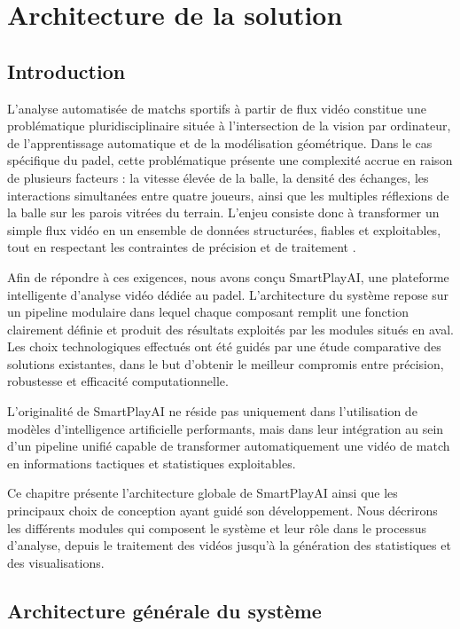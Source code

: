 \chapter{Architecture de la solution}

\section{Introduction}

L’analyse automatisée de matchs sportifs à partir de flux vidéo constitue une problématique pluridisciplinaire située à l’intersection de la vision par ordinateur, de l’apprentissage automatique et de la modélisation géométrique. Dans le cas spécifique du padel, cette problématique présente une complexité accrue en raison de plusieurs facteurs : la vitesse élevée de la balle, la densité des échanges, les interactions simultanées entre quatre joueurs, ainsi que les multiples réflexions de la balle sur les parois vitrées du terrain. L’enjeu consiste donc à transformer un simple flux vidéo en un ensemble de données structurées, fiables et exploitables, tout en respectant les contraintes de précision et de traitement  .

Afin de répondre à ces exigences, nous avons conçu SmartPlayAI, une plateforme intelligente d’analyse vidéo dédiée au padel. L’architecture du système repose sur un pipeline modulaire dans lequel chaque composant remplit une fonction clairement définie et produit des résultats exploités par les modules situés en aval. Les choix technologiques effectués ont été guidés par une étude comparative des solutions existantes, dans le but d’obtenir le meilleur compromis entre précision, robustesse et efficacité computationnelle.

L’originalité de SmartPlayAI ne réside pas uniquement dans l’utilisation de modèles d’intelligence artificielle performants, mais dans leur intégration au sein d’un pipeline unifié capable de transformer automatiquement une vidéo de match en informations tactiques et statistiques exploitables.

Ce chapitre présente l’architecture globale de SmartPlayAI ainsi que les principaux choix de conception ayant guidé son développement. Nous décrirons les différents modules qui composent le système et leur rôle dans le processus d’analyse, depuis le traitement des vidéos jusqu’à la génération des statistiques et des visualisations.
\section{Architecture générale du système}

